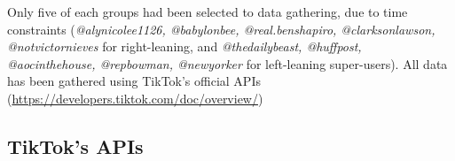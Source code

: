 Only five of each groups had been selected to data gathering, due to time constraints (\textit{@alynicolee1126, @babylonbee, @real.benshapiro, @clarksonlawson, @notvictornieves} for right-leaning, and \textit{@thedailybeast, @huffpost, @aocinthehouse, @repbowman, @newyorker} for left-leaning super-users). All data has been gathered using TikTok's official APIs (\url{https://developers.tiktok.com/doc/overview/})

\subsection{TikTok's APIs}



